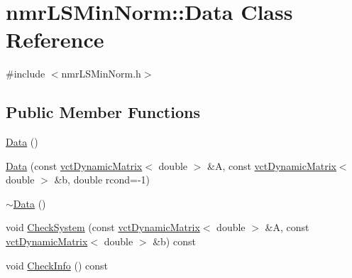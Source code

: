 \hypertarget{classnmr_l_s_min_norm_1_1_data}{}\section{nmr\+L\+S\+Min\+Norm\+:\+:Data Class Reference}
\label{classnmr_l_s_min_norm_1_1_data}


{\ttfamily \#include $<$nmr\+L\+S\+Min\+Norm.\+h$>$}

\subsection*{Public Member Functions}
\begin{DoxyCompactItemize}
\item 
\hyperlink{classnmr_l_s_min_norm_1_1_data_aac14796a2e9ea67eabed1c3aeafb18dc}{Data} ()
\item 
\hyperlink{classnmr_l_s_min_norm_1_1_data_a75696f0eb43c94317631b82f5dd3d06e}{Data} (const \hyperlink{classvct_dynamic_matrix}{vct\+Dynamic\+Matrix}$<$ double $>$ \&A, const \hyperlink{classvct_dynamic_matrix}{vct\+Dynamic\+Matrix}$<$ double $>$ \&b, double rcond=-\/1)
\item 
\hyperlink{classnmr_l_s_min_norm_1_1_data_a7f1b52e36a8c52466bab96cff2d720b3}{$\sim$\+Data} ()
\item 
void \hyperlink{classnmr_l_s_min_norm_1_1_data_a0f04597193b0f510af26b4affc034119}{Check\+System} (const \hyperlink{classvct_dynamic_matrix}{vct\+Dynamic\+Matrix}$<$ double $>$ \&A, const \hyperlink{classvct_dynamic_matrix}{vct\+Dynamic\+Matrix}$<$ double $>$ \&b) const 
\item 
void \hyperlink{classnmr_l_s_min_norm_1_1_data_aa7c3d0742321eeec5f6e7d87f942b111}{Check\+Info} () const 
\end{DoxyCompactItemize}
